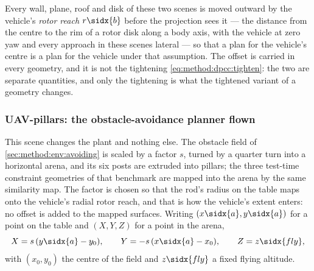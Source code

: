 Every wall, plane, roof and disk of these two scenes is moved outward by the vehicle's \emph{rotor
reach} $r\sidx{b}$ before the projection sees it --- the distance from the centre to the rim of a rotor
disk along a body axis, with the vehicle at zero yaw and every approach in these scenes lateral --- so
that a plan for the vehicle's centre is a plan for the vehicle under that assumption. The offset is
carried in every geometry, and it is not the tightening \eqref{eq:method:dpcc:tighten}: the two are
separate quantities, and only the tightening is what the tightened variant of a geometry changes.

\subsubsection*{UAV-pillars: the obstacle-avoidance planner flown}

This scene changes the plant and nothing else. The obstacle field of \autoref{sec:method:env:avoiding}
is scaled by a factor $s$, turned by a quarter turn into a horizontal arena, and its six posts are
extruded into pillars; the three test-time constraint geometries of that benchmark are mapped into the
arena by the same similarity map. The factor is chosen so that the rod's radius on the table maps onto
the vehicle's radial rotor reach, and that is how the vehicle's extent enters: no offset is added to the
mapped surfaces. Writing $(x\sidx{a},y\sidx{a})$ for a point on the table and $(X,Y,Z)$ for a point in
the arena,
\begin{equation}\label{eq:method:env:pillarsmap}
  X = s\,(y\sidx{a}-y_{0}),
  \qquad
  Y = -s\,(x\sidx{a}-x_{0}),
  \qquad
  Z = z\sidx{fly},
\end{equation}
with $(x_{0},y_{0})$ the centre of the field and $z\sidx{fly}$ a fixed flying altitude.

